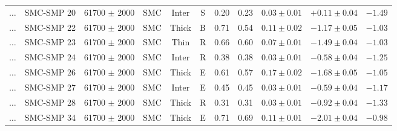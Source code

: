 \documentclass[useAMS]{mn2e}
\begin{document}
\begin{center}
{\begin{longtable}{llccccccccc}
$\ldots$	&	SMC-SMP 20	&	61700 $\pm$ 2000	&	SMC	&	Inter	&	S	&	0.20	&	0.23	&	$0.03 \pm  0.01$	&	$+0.11 \pm 0.04$	&	$-1.49$	\\
$\ldots$	&	SMC-SMP 22	&	61700 $\pm$ 2000	&	SMC	&	Thick	&	B	&	0.71	&	0.54	&	$0.11 \pm  0.02$	&	$-1.17 \pm 0.05$	&	$-1.03$	\\
$\ldots$	&	SMC-SMP 23	&	61700 $\pm$ 2000	&	SMC	&	Thin	&	R	&	0.66	&	0.60	&	$0.07 \pm  0.01$	&	$-1.49 \pm 0.04$	&	$-1.03$	\\
$\ldots$	&	SMC-SMP 24	&	61700 $\pm$ 2000	&	SMC	&	Inter	&	R	&	0.38	&	0.38	&	$0.03 \pm  0.01$	&	$-0.58 \pm 0.04$	&	$-1.25$	\\
$\ldots$	&	SMC-SMP 26	&	61700 $\pm$ 2000	&	SMC	&	Thick	&	E	&	0.61	&	0.57	&	$0.17 \pm  0.02$	&	$-1.68 \pm 0.05$	&	$-1.05$	\\
$\ldots$	&	SMC-SMP 27	&	61700 $\pm$ 2000	&	SMC	&	Inter	&	E	&	0.45	&	0.45	&	$0.03 \pm  0.01$	&	$-0.59 \pm 0.04$	&	$-1.17$	\\
$\ldots$	&	SMC-SMP 28	&	61700 $\pm$ 2000	&	SMC	&	Thick	&	R	&	0.31	&	0.31	&	$0.03 \pm  0.01$	&	$-0.92 \pm 0.04$	&	$-1.33$	\\
$\ldots$	&	SMC-SMP 34	&	61700 $\pm$ 2000	&	SMC	&	Thick	&	E	&	0.71	&	0.69	&	$0.11 \pm  0.01$	&	$-2.01 \pm 0.04$	&	$-0.98$	\\
\end{longtable}
}
\end{center}
\end{document}
